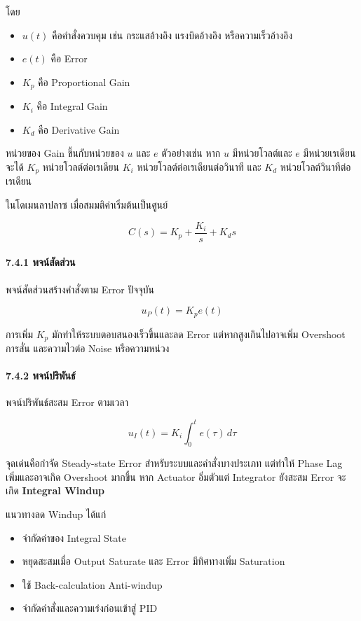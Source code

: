 โดย

\begin{itemize}
    \item $u(t)$ คือคำสั่งควบคุม เช่น กระแสอ้างอิง แรงบิดอ้างอิง หรือความเร็วอ้างอิง
    \item $e(t)$ คือ Error
    \item $K_p$ คือ Proportional Gain
    \item $K_i$ คือ Integral Gain
    \item $K_d$ คือ Derivative Gain
\end{itemize}

หน่วยของ Gain ขึ้นกับหน่วยของ $u$ และ $e$ ตัวอย่างเช่น หาก $u$ มีหน่วยโวลต์และ $e$ มีหน่วยเรเดียน จะได้ $K_p$ หน่วยโวลต์ต่อเรเดียน $K_i$ หน่วยโวลต์ต่อเรเดียนต่อวินาที และ $K_d$ หน่วยโวลต์วินาทีต่อเรเดียน

ในโดเมนลาปลาซ เมื่อสมมติค่าเริ่มต้นเป็นศูนย์

\[
C(s)=K_p+\frac{K_i}{s}+K_ds
\]

\paragraph{7.4.1 พจน์สัดส่วน}

พจน์สัดส่วนสร้างคำสั่งตาม Error ปัจจุบัน

\[
u_P(t)=K_pe(t)
\]

การเพิ่ม $K_p$ มักทำให้ระบบตอบสนองเร็วขึ้นและลด Error แต่หากสูงเกินไปอาจเพิ่ม Overshoot การสั่น และความไวต่อ Noise หรือความหน่วง

\paragraph{7.4.2 พจน์ปริพันธ์}

พจน์ปริพันธ์สะสม Error ตามเวลา

\[
u_I(t)=K_i\int_0^t e(\tau)\,d\tau
\]

จุดเด่นคือกำจัด Steady-state Error สำหรับระบบและคำสั่งบางประเภท แต่ทำให้ Phase Lag เพิ่มและอาจเกิด Overshoot มากขึ้น หาก Actuator อิ่มตัวแต่ Integrator ยังสะสม Error จะเกิด \textbf{Integral Windup}

แนวทางลด Windup ได้แก่

\begin{itemize}
    \item จำกัดค่าของ Integral State
    \item หยุดสะสมเมื่อ Output Saturate และ Error มีทิศทางเพิ่ม Saturation
    \item ใช้ Back-calculation Anti-windup
    \item จำกัดคำสั่งและความเร่งก่อนเข้าสู่ PID
\end{itemize}

